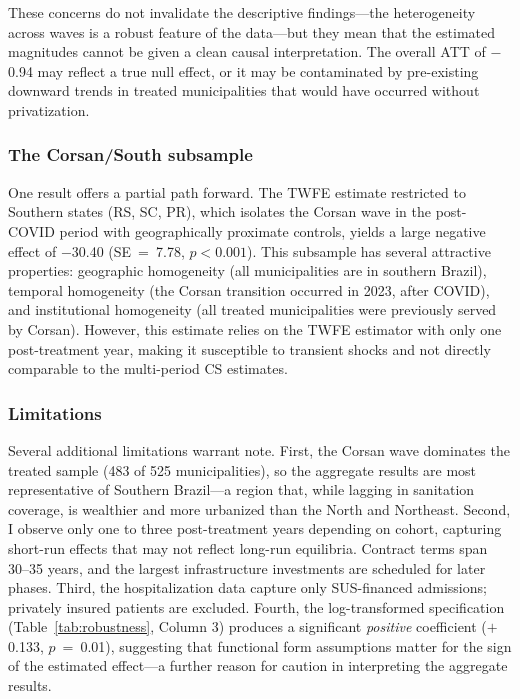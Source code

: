 \documentclass[12pt]{article}
\begin{document}
These concerns do not invalidate the descriptive findings---the heterogeneity across waves is a robust feature of the data---but they mean that the estimated magnitudes cannot be given a clean causal interpretation. The overall ATT of $-$0.94 may reflect a true null effect, or it may be contaminated by pre-existing downward trends in treated municipalities that would have occurred without privatization.

\subsubsection*{The Corsan/South subsample} One result offers a partial path forward. The TWFE estimate restricted to Southern states (RS, SC, PR), which isolates the Corsan wave in the post-COVID period with geographically proximate controls, yields a large negative effect of $-$30.40 (SE~=~7.78, $p<0.001$). This subsample has several attractive properties: geographic homogeneity (all municipalities are in southern Brazil), temporal homogeneity (the Corsan transition occurred in 2023, after COVID), and institutional homogeneity (all treated municipalities were previously served by Corsan). However, this estimate relies on the TWFE estimator with only one post-treatment year, making it susceptible to transient shocks and not directly comparable to the multi-period CS estimates.

\subsubsection*{Limitations} Several additional limitations warrant note. First, the Corsan wave dominates the treated sample (483 of 525 municipalities), so the aggregate results are most representative of Southern Brazil---a region that, while lagging in sanitation coverage, is wealthier and more urbanized than the North and Northeast. Second, I observe only one to three post-treatment years depending on cohort, capturing short-run effects that may not reflect long-run equilibria. Contract terms span 30--35 years, and the largest infrastructure investments are scheduled for later phases. Third, the hospitalization data capture only SUS-financed admissions; privately insured patients are excluded. Fourth, the log-transformed specification (Table~\ref{tab:robustness}, Column 3) produces a significant \textit{positive} coefficient ($+$0.133, $p$~=~0.01), suggesting that functional form assumptions matter for the sign of the estimated effect---a further reason for caution in interpreting the aggregate results.
\end{document}
